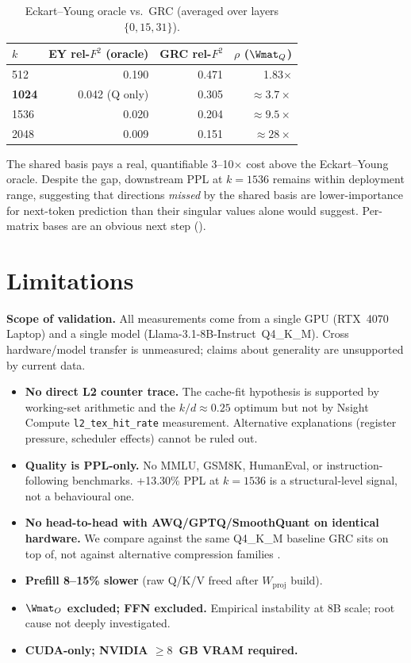 \documentclass[11pt]{article}
\begin{document}
\begin{table}[h]\centering\small
\caption{Eckart--Young oracle vs.\ GRC (averaged over layers $\{0,15,31\}$).}
\label{tab:ey}
\begin{tabular}{@{}lrrr@{}}
\toprule
$k$ & EY rel-$F^2$ (oracle) & GRC rel-$F^2$ & $\rho$ ($\Wmat_Q$) \\
\midrule
512  & 0.190 & 0.471 & 1.83$\times$ \\
\textbf{1024} & 0.042 (Q only) & 0.305 & $\approx 3.7\times$ \\
1536 & 0.020 & 0.204 & $\approx 9.5\times$ \\
2048 & 0.009 & 0.151 & $\approx 28\times$ \\
\bottomrule
\end{tabular}
\end{table}

The shared basis pays a real, quantifiable 3--10$\times$ cost above the
Eckart--Young oracle.  Despite the gap, downstream PPL at $k{=}1536$ remains
within deployment range, suggesting that directions \emph{missed} by the
shared basis are lower-importance for next-token prediction than their
singular values alone would suggest.  Per-matrix bases are an obvious next
step ().

\section{Limitations}
\label{sec:limits}

\begin{htwarn}
\textbf{Scope of validation.}  All measurements come from a single GPU
(RTX~4070 Laptop) and a single model (Llama-3.1-8B-Instruct~Q4\_K\_M).  Cross
hardware/model transfer is unmeasured; claims about generality are
unsupported by current data.
\end{htwarn}

\begin{itemize}
\item \textbf{No direct L2 counter trace.}  The cache-fit hypothesis is
supported by working-set arithmetic and the $k/d{\approx}0.25$ optimum but
not by Nsight Compute \texttt{l2\_tex\_hit\_rate} measurement.  Alternative
explanations (register pressure, scheduler effects) cannot be ruled out.
\item \textbf{Quality is PPL-only.}  No MMLU, GSM8K, HumanEval, or instruction-
following benchmarks.  +13.30\% PPL at $k{=}1536$ is a structural-level
signal, not a behavioural one.
\item \textbf{No head-to-head with AWQ/GPTQ/SmoothQuant on identical
hardware.}  We compare against the same Q4\_K\_M baseline GRC sits on top
of, not against alternative compression families
\cite{lin2023awq,frantar2022gptq,xiao2022smoothquant}.
\item \textbf{Prefill 8--15\% slower} (raw Q/K/V freed after $W_\text{proj}$ build).
\item \textbf{$\Wmat_O$ excluded; FFN excluded.}  Empirical instability at
8B scale; root cause not deeply investigated.
\item \textbf{CUDA-only; NVIDIA $\geq 8$~GB VRAM required.}
\end{itemize}
\end{document}
